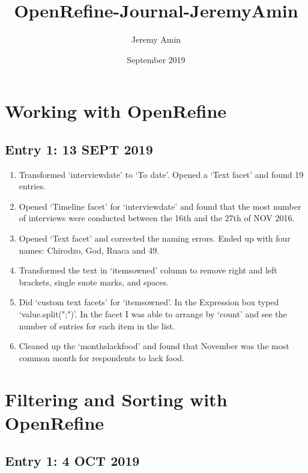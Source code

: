 \documentclass{article}
\title{OpenRefine-Journal-JeremyAmin}
\author{Jeremy Amin}
\date{September 2019}
\begin{document}
\maketitle

\section{Working with OpenRefine}

\subsection{Entry 1: 13 SEPT 2019}

\begin{enumerate}
\item Transformed `interview\textunderscore date' to `To date'. Opened a `Text facet' and found 19 entries.
\item Opened `Timeline facet' for `interview\textunderscore date' and found that the most number of interviews were conducted between the 16th and the 27th of NOV 2016.
\item Opened `Text facet' and corrected the naming errors. Ended up with four names: Chirodzo, God, Ruaca and 49.
\item Transformed the text in `items\textunderscore owned' column to remove right and left brackets, single suote marks, and spaces.
\item Did `custom text facets' for `items\textunderscore owned'. In the Expression box  typed `value.split(";")'. In the facet I was able to arrange by `count' and see the number of entries for each item in the list.
\item Cleaned up the `months\textunderscore lack\textunderscore food' and found that November was the most common month for respondents to lack food.
\end{enumerate}

\section{Filtering and Sorting with OpenRefine}
\subsection{Entry 1: 4 OCT 2019}
\end{document}

